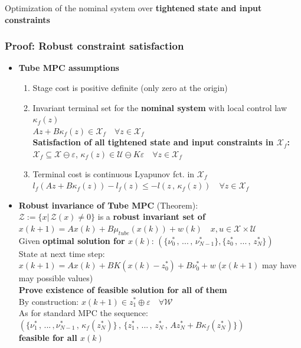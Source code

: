 \rightarrow Optimization of the nominal system over \textbf{tightened state and input constraints}\\
\subsubsection{Proof: Robust constraint satisfaction}
\begin{itemize}[leftmargin=*]
    \item \textbf{Tube MPC assumptions}\\
    \begin{enumerate}
        \item Stage cost is positive definite (only zero at the origin)
        \item Invariant terminal set for the \textbf{nominal system} with local control law $\kappa_f(z)$\\
        $Az+B\kappa_f(z)\in\mathcal{X}_f\quad\forall z\in\mathcal{X}_f$\\
        \textbf{Satisfaction of all tightened state and input constraints in $\mathcal{X}_f$:}\\
        $\mathcal{X}_f\subseteq\mathcal{X}\ominus\varepsilon$, $\kappa_f(z)\in\mathcal{U}\ominus K\varepsilon\quad \forall z\in\mathcal{X}_f$
        \item Terminal cost is continuous Lyapunov fct. in $\mathcal{X}_f$\\
        $l_f(Az+B\kappa_f(z))-l_f(z)\leq-l(z\,,\,\kappa_f(z))\quad\forall z\in\mathcal{X}_f$
    \end{enumerate}
    \item
    \textbf{Robust invariance of Tube MPC} (Theorem):\\
    $\mathcal{Z}:=\{x|\,\mathcal{Z}(x)\neq 0\}$ is a \textbf{robust invariant set of} \rightarrow $x(k+1)=Ax(k)+B\mu_{tube}(x(k))+w(k)\quad x,u\in\mathcal{X}\times\mathcal{U}$\\
    Given \textbf{optimal solution for $x(k)$}: $(\{\nu_0^*\,,\,...\,,\,\nu_{N-1}^*\},\{z_0^*\,,\,...\,,\,z_N^*\})$\\
    State at next time step:
    $x(k+1)=Ax(k)+BK(x(k)-z^*_0)+B\nu_0^*+w$ ($x(k+1)$ may have may possible values)\\
    \rightarrow \textbf{Prove existence of feasible solution for all of them}\\
    By construction: $x(k+1)\in z_1^*\oplus \varepsilon\quad \forall \mathcal{W}$\\
    As for standard MPC the sequence:\\
    $(\{\nu_1^*\,,\,...\,,\nu_{N-1}^*\,,\,\kappa_f(z_N^*)\}\,,\,\{z_1^*\,,\,...\,,\,z_N^*\,,\,Az_N^*+B\kappa_f(z_N^*)\})$\\\rightarrow \textbf{feasible for all $x(k)$}
\end{itemize}

